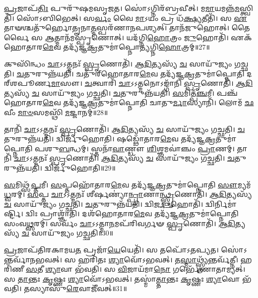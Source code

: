 \-\ul{𑌪𑍍𑌰}\-𑌜𑌾\-𑌪᳴\-\ul{𑌤𑌿𑌃} 𑌪𑍁𑌰𑍁᳴𑌷𑌮\-𑌸𑍃𑌜𑌤।
𑌸𑍋॑𑌽𑌗𑍍𑌨𑌿𑌰᳴𑌬𑍍𑌰𑌵𑍀𑌤𑍍।
𑌮\-\ul{𑌮𑌾}\-𑌯𑌮𑌨𑍍𑌨᳴\-\-\ul{𑌮}\-𑌸𑍍𑌤𑍍𑌵𑌿𑌤𑌿᳴।
𑌸𑍋᳴𑌽𑌬𑌿𑌭𑍇𑌤𑍍।
𑌸\-\ul{𑌰𑍍𑌵𑌂} 𑌵𑍈 \ul{𑌮𑌾}\-𑌽𑌯𑌂 𑌪𑍍𑌰 𑌧᳴\-\ul{𑌕𑍍𑌷𑍍𑌯}\-𑌤𑍀𑌤𑌿᳴।
𑌸 \ul{𑌏}\-𑌤𑌾𑍟𑌶𑍍𑌚𑌤𑍁᳴𑌰𑍍\mbox{}𑌹𑍋𑌤𑍄𑌨𑌾\-\ul{𑌤𑍍𑌮}\-𑌸𑍍𑌪𑌰᳴𑌣𑌾𑌨𑌪𑌶𑍍𑌯𑌤𑍍।
𑌤𑌾𑌨᳴𑌜𑍁𑌹𑍋𑌤𑍍।
𑌤𑍈𑌰𑍍𑌵𑍈 𑌸 \ul{𑌆}\-𑌤𑍍𑌮𑌾𑌨᳴𑌮𑌸𑍍𑌪𑍃𑌣𑍋𑌤𑍍।
𑌯𑌦᳴𑌗𑍍𑌨𑌿\-\ul{𑌹𑍋}\-𑌤𑍍𑌰𑌂 \ul{𑌜𑍁}\-𑌹𑍋𑌤𑌿᳴।
𑌏𑌕᳴𑌹𑍋𑌤𑌾𑌰\-\ul{𑌮𑍇}\-𑌵 𑌤𑌦𑍍𑌯᳴𑌜𑍍𑌞\-\ul{𑌕𑍍𑌰}\-𑌤𑍁𑌮𑌾॑𑌪𑍍𑌨𑍋𑌤𑍍𑌯𑌗𑍍𑌨𑌿\-\ul{𑌹𑍋}\-𑌤𑍍𑌰𑌮𑍍॥27॥

𑌕𑍁𑌸𑌿᳴𑌨𑍍𑌧𑌂 \ul{𑌚𑌾}\-𑌽𑌽𑌤𑍍𑌮𑌨𑌃᳴ \ul{𑌸𑍍𑌪𑍃}\-𑌣𑍋𑌤𑌿᳴।
\-\ul{𑌆}\-\-\ul{𑌦𑌿}\-𑌤𑍍𑌯𑌸𑍍𑌯᳴ \ul{𑌚} 𑌸𑌾𑌯𑍁᳴𑌜𑍍𑌯𑌂 𑌗𑌚𑍍𑌛𑌤𑌿।
\-\ul{𑌚}\-𑌤𑍁𑌰𑍁𑌨𑍍𑌨᳴𑌯𑌤𑌿।
𑌚𑌤𑍁᳴𑌰𑍍‌\mbox{}𑌹𑍋𑌤𑌾𑌰\-\ul{𑌮𑍇}\-𑌵 𑌤𑌦𑍍𑌯᳴𑌜𑍍𑌞\-\ul{𑌕𑍍𑌰}\-𑌤𑍁𑌮𑌾॑𑌪𑍍𑌨𑍋𑌤𑌿 𑌦𑌰𑍍‌\mbox{}𑌶𑌪𑍂𑌰𑍍𑌣\-\ul{𑌮𑌾}\-𑌸𑍗।
\-\ul{𑌚}\-𑌤𑍍𑌵𑌾𑌰𑌿᳴ \ul{𑌚𑌾}\-𑌽𑌽𑌤𑍍𑌮𑌨𑍋\-𑌽𑌙𑍍𑌗𑌾᳴𑌨𑌿 \ul{𑌸𑍍𑌪𑍃}\-𑌣𑍋𑌤𑌿᳴।
\-\ul{𑌆}\-\-\ul{𑌦𑌿}\-𑌤𑍍𑌯𑌸𑍍𑌯᳴ \ul{𑌚} 𑌸𑌾𑌯𑍁᳴𑌜𑍍𑌯𑌂 𑌗𑌚𑍍𑌛𑌤𑌿।
\-\ul{𑌚}\-𑌤𑍁𑌰𑍁𑌨𑍍𑌨᳴𑌯𑌤𑌿।
\-\ul{𑌸}\-𑌮𑌿𑌤𑍍𑌪᳴\-\ul{𑌞𑍍𑌚}\-𑌮𑍀।
𑌪𑌞𑍍𑌚᳴𑌹𑍋𑌤𑌾𑌰\-\ul{𑌮𑍇}\-𑌵 𑌤𑌦𑍍𑌯᳴𑌜𑍍𑌞\-\ul{𑌕𑍍𑌰}\-𑌤𑍁𑌮𑌾॑𑌪𑍍𑌨𑍋𑌤𑌿 𑌚𑌾𑌤𑍁\-\ul{𑌰𑍍𑌮𑌾}\-𑌸𑍍𑌯𑌾𑌨𑌿᳴।
𑌲𑍋𑌮᳴ \ul{𑌛}\-𑌵𑍀𑌂 \ul{𑌮𑌾}\-\-\ul{𑍞}\-𑌸𑌮𑌸𑍍𑌥𑌿᳴ \ul{𑌮}\-𑌜𑍍𑌜𑌾𑌨𑌮𑍍॑॥28॥

𑌤𑌾𑌨𑌿᳴ \ul{𑌚𑌾}\-𑌽𑌽𑌤𑍍𑌮𑌨𑌃᳴ \ul{𑌸𑍍𑌪𑍃}\-𑌣𑍋𑌤𑌿᳴।
\-\ul{𑌆}\-\-\ul{𑌦𑌿}\-𑌤𑍍𑌯𑌸𑍍𑌯᳴ \ul{𑌚} 𑌸𑌾𑌯𑍁᳴𑌜𑍍𑌯𑌂 𑌗𑌚𑍍𑌛𑌤𑌿।
\-\ul{𑌚}\-𑌤𑍁𑌰𑍁𑌨𑍍𑌨᳴𑌯𑌤𑌿।
𑌦𑍍𑌵𑌿𑌰𑍍𑌜𑍁᳴𑌹𑍋𑌤𑌿।
𑌷𑌡𑍍𑌢𑍋᳴𑌤𑌾𑌰\-\ul{𑌮𑍇}\-𑌵 𑌤𑌦𑍍𑌯᳴𑌜𑍍𑌞\-\ul{𑌕𑍍𑌰}\-𑌤𑍁𑌮𑌾॑𑌪𑍍𑌨𑍋𑌤𑌿 𑌪𑌶𑍁\-\ul{𑌬}\-𑌨𑍍𑌧𑌮𑍍।
𑌸𑍍𑌤𑌨𑌾᳴\-\ul{𑌵𑌾}\-𑌣𑍍𑌡𑍗 \ul{𑌶𑌿}\-𑌶𑍍𑌞𑌮𑌵𑌾॑𑌞𑍍𑌚𑌂 \ul{𑌪𑍍𑌰𑌾}\-𑌣𑌮𑍍।
𑌤𑌾𑌨𑌿᳴ \ul{𑌚𑌾}\-𑌽𑌽𑌤𑍍𑌮𑌨𑌃᳴ \ul{𑌸𑍍𑌪𑍃}\-𑌣𑍋𑌤𑌿᳴।
\-\ul{𑌆}\-\-\ul{𑌦𑌿}\-𑌤𑍍𑌯𑌸𑍍𑌯᳴ \ul{𑌚} 𑌸𑌾𑌯𑍁᳴𑌜𑍍𑌯𑌂 𑌗𑌚𑍍𑌛𑌤𑌿।
\-\ul{𑌚}\-𑌤𑍁𑌰𑍁𑌨𑍍𑌨᳴𑌯𑌤𑌿।
𑌦𑍍𑌵𑌿𑌰𑍍𑌜𑍁᳴𑌹𑍋𑌤𑌿॥29॥

\-\ul{𑌸}\-𑌮𑌿𑌥𑍍𑌸᳴\-\ul{𑌪𑍍𑌤}\-𑌮𑍀।
\-\ul{𑌸}\-𑌪𑍍𑌤𑌹𑍋᳴𑌤𑌾𑌰\-\ul{𑌮𑍇}\-𑌵 𑌤𑌦𑍍𑌯᳴𑌜𑍍𑌞\-\ul{𑌕𑍍𑌰}\-𑌤𑍁𑌮𑌾॑𑌪𑍍𑌨𑍋𑌤𑌿 \ul{𑌸𑍗}\-𑌮𑍍𑌯𑌮᳴\-\ul{𑌧𑍍𑌵}\-𑌰𑌮𑍍।
\-\ul{𑌸}\-𑌪𑍍𑌤 \ul{𑌚𑌾}\-𑌽𑌽𑌤𑍍𑌮𑌨𑌃᳴ 𑌶𑍀𑌰𑍍\mbox{}\-\ul{𑌷}\-𑌣𑍍𑌯𑌾॑\-\ul{𑌨𑍍𑌪𑍍𑌰𑌾}\-𑌣𑌾\-\ul{𑌨𑍍𑌥𑍍𑌸𑍍𑌪𑍃}\-𑌣𑍋𑌤𑌿᳴।
\-\ul{𑌆}\-\-\ul{𑌦𑌿}\-𑌤𑍍𑌯𑌸𑍍𑌯᳴ \ul{𑌚} 𑌸𑌾𑌯𑍁᳴𑌜𑍍𑌯𑌂 𑌗𑌚𑍍𑌛𑌤𑌿।
\-\ul{𑌚}\-𑌤𑍁𑌰𑍁𑌨𑍍𑌨᳴𑌯𑌤𑌿।
𑌦𑍍𑌵𑌿\-\ul{𑌰𑍍𑌜𑍁}\-𑌹𑍋𑌤𑌿᳴।
𑌦𑍍𑌵𑌿𑌰𑍍𑌨𑌿𑌮𑌾॑𑌰𑍍𑌷𑍍𑌟𑌿।
𑌦𑍍𑌵𑌿𑌃 𑌪𑍍𑌰𑌾𑌶𑍍𑌞𑌾᳴𑌤𑌿।
𑌦𑌶᳴𑌹𑍋𑌤𑌾𑌰\-\ul{𑌮𑍇}\-𑌵 𑌤𑌦𑍍𑌯᳴𑌜𑍍𑌞\-\ul{𑌕𑍍𑌰}\-𑌤𑍁𑌮𑌾॑𑌪𑍍𑌨𑍋𑌤𑌿 𑌸𑌂𑌵\-\ul{𑌥𑍍𑌸}\-𑌰𑌮𑍍।
𑌸𑌰𑍍𑌵𑌂᳴ \ul{𑌚𑌾}\-𑌽𑌽𑌤𑍍𑌮𑌾\-\ul{𑌨}\-𑌮𑌪᳴𑌰𑌿𑌵𑌰𑍍𑌗𑍟 \ul{𑌸𑍍𑌪𑍃}\-𑌣𑍋𑌤𑌿᳴।
\-\ul{𑌆}\-\-\ul{𑌦𑌿}\-𑌤𑍍𑌯𑌸𑍍𑌯᳴ \ul{𑌚} 𑌸𑌾𑌯𑍁᳴𑌜𑍍𑌯𑌂 𑌗𑌚𑍍𑌛𑌤𑌿॥30॥\anuvakamend[\-\ul{𑌅}\-\-\ul{𑌗𑍍𑌨𑌿}\-\-\ul{𑌹𑍋}\-𑌤𑍍𑌰𑌂 \ul{𑌮}\-𑌜𑍍𑌜𑌾\-\ul{𑌨}\-𑌨𑍍𑌦𑍍𑌵𑌿𑌰𑍍𑌜𑍁᳴\-\ul{𑌹𑍋}\-𑌤𑍍𑌯𑌪᳴𑌰𑌿𑌵𑌰𑍍𑌗𑍟 \ul{𑌸𑍍𑌪𑍃}\-𑌣𑍋𑌤𑍍𑌯𑍇𑌕𑌂᳴ 𑌚]

\-\ul{𑌪𑍍𑌰}\-𑌜𑌾𑌪᳴𑌤𑌿𑌰𑌕𑌾𑌮𑌯\-\ul{𑌤} 𑌪𑍍𑌰𑌜𑌾᳴\-\ul{𑌯𑍇}\-𑌯𑍇𑌤𑌿᳴।
𑌸 𑌤𑌪𑍋᳴\-𑌽𑌤𑌪𑍍𑌯𑌤।
𑌸𑍋॑𑌽𑌨𑍍𑌤𑌰𑍍𑌵𑌾᳴𑌨𑌭𑌵𑌤𑍍।
𑌸 𑌹𑌰𑌿᳴𑌤𑌃 \ul{𑌶𑍍𑌯𑌾}\-𑌵𑍋᳴\-𑌽𑌭𑌵𑌤𑍍।
𑌤\-\ul{𑌸𑍍𑌮𑌾}\-𑌥𑍍𑌸𑍍𑌤𑍍𑌰𑍍𑌯᳴𑌨𑍍𑌤𑌰𑍍𑌵᳴𑌤𑍍𑌨𑍀।
𑌹𑌰𑌿᳴𑌣𑍀 \ul{𑌸}\-𑌤𑍀 \ul{𑌶𑍍𑌯𑌾}\-𑌵𑌾 𑌭᳴𑌵𑌤𑌿।
𑌸 \ul{𑌵𑌿}\-𑌜𑌾𑌯᳴𑌮𑌾\-\ul{𑌨𑍋} 𑌗𑌰𑍍𑌭𑍇᳴𑌣𑌾𑌤𑌾𑌮𑍍𑌯𑌤𑍍।
𑌸 \ul{𑌤𑌾}\-𑌨𑍍𑌤𑌃 \ul{𑌕𑍃}\-𑌷𑍍𑌣𑌃 \ul{𑌶𑍍𑌯𑌾}\-𑌵𑍋᳴\-𑌽𑌭𑌵𑌤𑍍।
𑌤𑌸𑍍𑌮𑌾॑\-\ul{𑌤𑍍𑌤𑌾}\-𑌨𑍍𑌤𑌃 \ul{𑌕𑍃}\-𑌷𑍍𑌣𑌃 \ul{𑌶𑍍𑌯𑌾}\-𑌵𑍋 𑌭᳴𑌵𑌤𑌿।
𑌤𑌸𑍍𑌯𑌾𑌸𑍁᳴\-\ul{𑌰𑍇}\-𑌵𑌾𑌜𑍀᳴𑌵𑌤𑍍॥31॥

